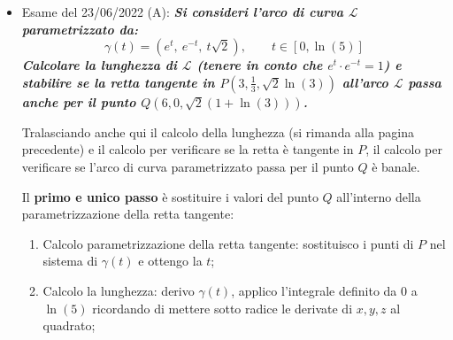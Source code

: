\documentclass[a4paper]{article}
\begin{document}
\begin{itemize}
		\item Esame del 23/06/2022 (A): \textcolor{Green4}{\textbf{\emph{Si consideri l'arco di curva $\mathcal{L}$ parametrizzato da:}}
		\begin{equation*}
			\gamma\left(t\right) = \left(e^{t}, \: e^{-t}, \: t\sqrt{2}\right), \hspace{2em} t\in\left[0, \ln\left(5\right)\right]
		\end{equation*}
		\textbf{\emph{Calcolare la lunghezza di $\mathcal{L}$ (tenere in conto che $e^{t} \cdot e^{-t} = 1$) e stabilire se la retta tangente in $P\left(3, \frac{1}{3}, \sqrt{2}\ln\left(3\right)\right)$ all'arco $\mathcal{L}$ passa anche per il punto $Q\left(6,0,\sqrt{2}\left(1+\ln\left(3\right)\right)\right)$.}}}

		Tralasciando anche qui il calcolo della lunghezza (si rimanda alla pagina precedente) e il calcolo per verificare se la retta è tangente in $P$, il calcolo per verificare se l'arco di curva parametrizzato passa per il punto $Q$ è banale.

		Il \textbf{primo e unico passo} è sostituire i valori del punto $Q$ all'interno della parametrizzazione della retta tangente:
		\begin{enumerate}
			\item Calcolo parametrizzazione della retta tangente: sostituisco i punti di $P$ nel sistema di $\gamma\left(t\right)$ e ottengo la $t$;
		
			\item Calcolo la lunghezza: derivo $\gamma\left(t\right)$, applico l'integrale definito da $0$ a $\ln\left(5\right)$ ricordando di mettere sotto radice le derivate di $x,y,z$ al quadrato;\newpage
		

\end{enumerate}
\end{itemize}
\end{document}
